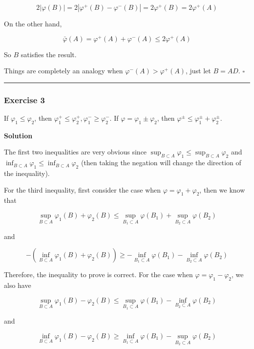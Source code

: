 \documentclass[
]{article}
\begin{document}
\[2|\varphi(B)| = 2|\varphi^+(B) - \varphi^-(B)| = 2\varphi^+(B) = 2\varphi^+(A)\]

On the other hand,

\[\bar \varphi(A) = \varphi^+(A) + \varphi^-(A) \le 2 \varphi^+(A)\]

So \(B\) satisfies the result.

Things are completely an analogy when \(\varphi^-(A) > \varphi^+(A)\),
just let \(B = AD\). \(\square\)

\begin{center}\rule{0.5\linewidth}{0.5pt}\end{center}

\hypertarget{exercise-3}{%
  \subsubsection{\texorpdfstring{Exercise 3
    }{Exercise 3 }}\label{exercise-3}}

If \(\varphi_1 \le \varphi_2\), then
\(\varphi_1^{+} \le \varphi_2^{+}, \varphi_1^{-} \ge \varphi_2^{-}\). If
\(\varphi=\varphi_1 \pm \varphi_2\), then
\(\varphi^{\pm} \le \varphi_1 ^\pm+\varphi_2 ^\pm\).

\textbf{Solution}

The first two inequalities are very obvious since
\(\sup_{B\subset A} \varphi_1 \le \sup_{B\subset A} \varphi_2\) and
\(\inf_{B\subset A} \varphi_1 \le \inf_{B\subset A} \varphi_2 \) (then
taking the negation will change the direction of the inequality).

For the third inequality, first consider the case when
\(\varphi = \varphi_1 + \varphi_2\), then we know that

\[\sup_{B\subset A} \varphi_1(B) + \varphi_2(B) \le  \sup_{B_1\subset A} \varphi(B_1) + \sup_{B_2\subset A} \varphi(B_2)\]

and

\[-(\inf_{B\subset A} \varphi_1(B) + \varphi_2(B)) \ge  -\inf_{B_1\subset A} \varphi(B_1) - \inf_{B_2\subset A} \varphi(B_2)\]

Therefore, the inequality to prove is correct. For the case when
\(\varphi = \varphi_1 - \varphi_2\), we also have

\[\sup_{B\subset A} \varphi_1(B) - \varphi_2(B) \le  \sup_{B_1\subset A} \varphi(B_1) - \inf_{B_2\subset A} \varphi(B_2)\]

and

\[\inf_{B\subset A} \varphi_1(B) - \varphi_2(B) \ge  \inf_{B_1\subset A} \varphi(B_1) - \sup_{B_2\subset A} \varphi(B_2)\]
\end{document}
